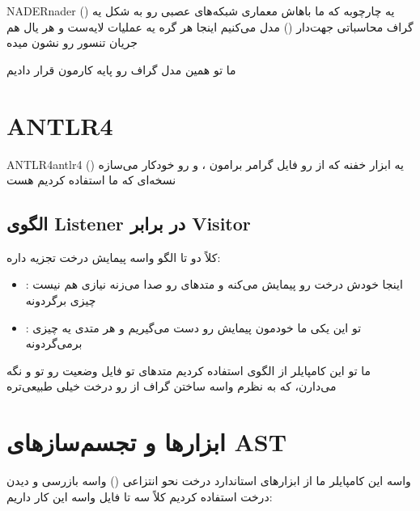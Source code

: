\documentclass{nngraph-fa}
\begin{document}
\begin{dfnbox}{NADER}{nader}
 ()
یه چارچوبه که ما باهاش معماری شبکه‌های عصبی رو به شکل یه گراف محاسباتی جهت‌دار () مدل می‌کنیم
اینجا هر گره یه عملیات لایه‌ست و هر یال هم جریان تنسور رو نشون میده
\end{dfnbox}

ما تو  همین مدل گراف رو پایه کارمون قرار دادیم

\section{ANTLR4}

\begin{dfnbox}{ANTLR4}{antlr4}
 ()
یه ابزار خفنه که از رو فایل گرامر  برامون ،  و  رو خودکار می‌سازه
نسخه‌ای که ما استفاده کردیم  هست
\end{dfnbox}

\subsection{الگوی Listener در برابر Visitor}

کلاً  دو تا الگو واسه پیمایش درخت تجزیه داره:

\begin{itemize}
    \item \textbf{}: اینجا  خودش درخت رو پیمایش می‌کنه و متدهای  رو صدا می‌زنه
    نیازی هم نیست چیزی برگردونه
    \item \textbf{}: تو این یکی ما خودمون پیمایش رو دست می‌گیریم و هر متدی یه چیزی برمی‌گردونه
\end{itemize}

\begin{notebox}
ما تو این کامپایلر از الگوی  استفاده کردیم
متدهای  تو فایل  وضعیت رو تو  و  نگه می‌دارن، که به نظرم واسه ساختن گراف از رو درخت خیلی طبیعی‌تره
\end{notebox}

\section{ابزارها و تجسم‌سازهای AST}

واسه این کامپایلر ما از ابزارهای استاندارد درخت نحو انتزاعی () واسه بازرسی و دیدن درخت استفاده کردیم
کلاً سه تا فایل واسه این کار داریم:
\end{document}

